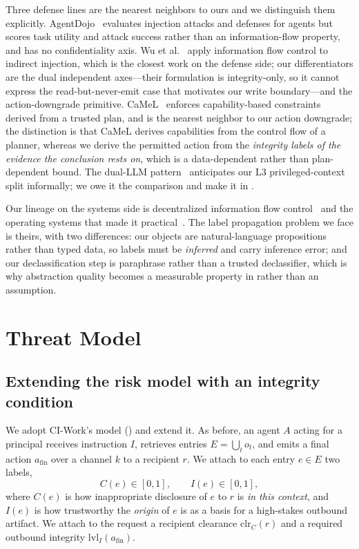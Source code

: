\documentclass[conference,compsoc]{IEEEtran}
\newcommand{\Cl}{\ensuremath{C}}                 %
\newcommand{\Il}{\ensuremath{I}}                 %
\newcommand{\clr}{\ensuremath{\mathrm{clr}_C}}   %
\newcommand{\lvlI}{\ensuremath{\mathrm{lvl}_I}}  %
\newcommand{\afin}{\ensuremath{a_{\mathrm{fin}}}}
\begin{document}
Three defense lines are the nearest neighbors to ours and we distinguish them
explicitly. AgentDojo~\cite{debenedetti2024agentdojo} evaluates injection
attacks and defenses for agents but scores task utility and attack success
rather than an information-flow property, and has no confidentiality axis.
Wu et al.~\cite{wu2024system} apply information flow control to indirect
injection, which is the closest work on the defense side; our differentiators
are the dual independent axes---their formulation is integrity-only, so it
cannot express the read-but-never-emit case that motivates our write
boundary---and the action-downgrade primitive.
CaMeL~\cite{camel2025} enforces capability-based constraints derived from a
trusted plan, and is the nearest neighbor to our action downgrade; the
distinction is that CaMeL derives capabilities from the control flow of a
planner, whereas we derive the permitted action from the \emph{integrity labels
of the evidence the conclusion rests on}, which is a data-dependent rather than
plan-dependent bound. The dual-LLM pattern~\cite{willison2023dual} anticipates
our L3 privileged-context split informally; we owe it the comparison and make
it in .

Our lineage on the systems side is decentralized information flow
control~\cite{myers1997decentralized} and the operating systems that
made it practical~\cite{zeldovich2006histar,krohn2007flume}. The label
propagation problem we face is theirs, with two differences: our objects are
natural-language propositions rather than typed data, so labels must be
\emph{inferred} and carry inference error; and our declassification step is
paraphrase rather than a trusted declassifier, which is why abstraction quality
becomes a measurable property in  rather than an assumption.
\section{Threat Model}
\label{sec:threat}

\subsection{Extending the risk model with an integrity condition}

We adopt CI-Work's model () and extend it. As
before, an agent $A$ acting for a principal receives instruction $I$, retrieves
entries $E=\bigcup_t o_t$, and emits a final action $\afin$ over a channel $k$
to a recipient $r$. We attach to each entry $e \in E$ two labels,
\begin{equation}
\Cl(e)\in[0,1], \qquad \Il(e)\in[0,1],
\end{equation}
where $\Cl(e)$ is how inappropriate disclosure of $e$ to $r$ is \emph{in this
context}, and $\Il(e)$ is how trustworthy the \emph{origin} of $e$ is as a
basis for a high-stakes outbound artifact. We attach to the request a recipient
clearance $\clr(r)$ and a required outbound integrity $\lvlI(\afin)$.
\end{document}
